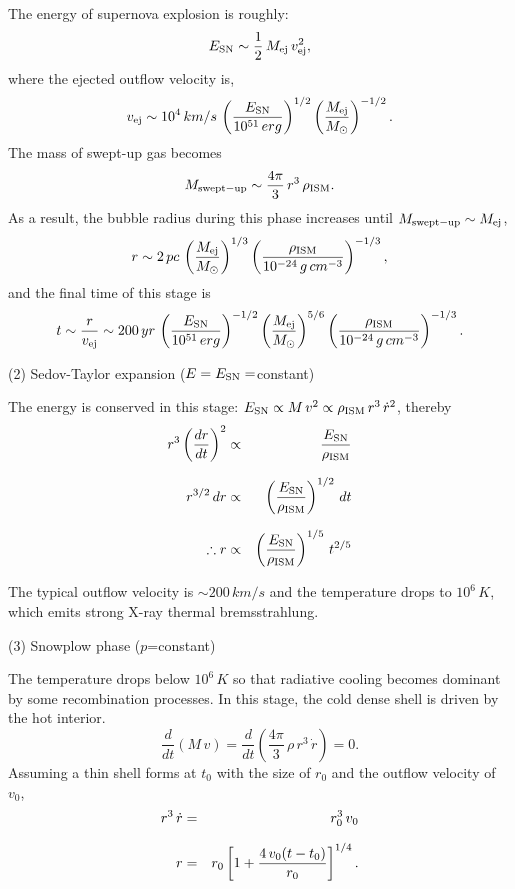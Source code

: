 The energy of supernova explosion is roughly:
\begin{equation}
    E_{\rm SN} \sim \frac{1}{2}\,M_{\rm ej}\,v_{\rm ej}^{2},
\end{equation}
where the ejected outflow velocity is,
\begin{equation}
    v_{\rm ej} \sim 10^{4}\, km/s \, \left( \frac{E_{\rm SN}}{10^{51}\,erg} \right)^{1/2} \left( \frac{M_{\rm ej}}{M_{\odot}} \right)^{-1/2}.
\end{equation}
The mass of swept-up gas becomes
\begin{equation}
    M_{\rm swept-up} \sim \frac{4\pi}{3}\,r^{3}\,\rho_{\rm ISM}.
\end{equation}
As a result, the bubble radius during this phase increases until $M_{\rm swept-up} \sim M_{\rm ej}$,
\begin{equation}
    r \sim 2\,pc\,\left( \frac{M_{\rm ej}}{M_{\odot}} \right)^{1/3} \left( \frac{\rho_{\rm ISM}}{10^{-24}\,g\,cm^{-3}} \right)^{-1/3},
\end{equation}
and the final time of this stage is
\begin{equation}
    t \sim \frac{r}{v_{\rm ej}} \sim 200\, yr\, \left( \frac{E_{\rm SN}}{10^{51}\,erg} \right)^{-1/2} \left( \frac{M_{\rm ej}}{M_{\odot}} \right)^{5/6}
                                 \left( \frac{\rho_{\rm ISM}}{10^{-24}\,g\,cm^{-3}} \right)^{-1/3}.
\end{equation}

\noi (2) Sedov-Taylor expansion ($E=E_{\rm SN}=$constant)

The energy is conserved in this stage: $E_{\rm SN} \propto M\,v^{2} \propto \rho_{\rm ISM}\,r^{3}\,\dot{r}^{2}$,
thereby
\begin{eqnarray}
    r^{3}\left( \frac{dr}{dt} \right)^{2} &\propto& \frac{E_{\rm SN}}{\rho_{\rm ISM}} \nonumnext
    r^{3/2}\,dr &\propto& \left( \frac{E_{\rm SN}}{\rho_{\rm ISM}} \right)^{1/2}\,dt \nonumnext
    \therefore r &\propto& \left( \frac{E_{\rm SN}}{\rho_{\rm ISM}} \right)^{1/5}\, t^{2/5} 
\end{eqnarray}

The typical outflow velocity is $\sim 200\, km/s$ and the temperature drops to $10^{6}\, K$, which emits
strong X-ray thermal bremsstrahlung.

\noi (3) Snowplow phase ($p$=constant)

The temperature drops below $10^{6}\, K$ so that radiative cooling becomes dominant by some recombination processes.
In this stage, the cold dense shell is driven by the hot interior. 
\begin{equation}
    \frac{d}{dt}(M\,v) = \frac{d}{dt}\left( \frac{4\pi}{3}\,\rho\,r^{3}\,\dot{r} \right) = 0.
\end{equation}
Assuming a thin shell forms at $t_{0}$ with the size of $r_{0}$ and the outflow velocity of $v_{0}$,
\begin{eqnarray}
    r^{3}\,\dot{r} &=& r_{0}^{3}\,v_{0} \nonumnext
    r &=& r_{0} \left[ 1 + \frac{4\,v_{0} (t-t_{0})}{r_{0}} \right]^{1/4}.
\end{eqnarray}

